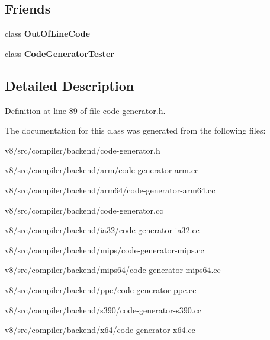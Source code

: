 \subsection*{Friends}
\begin{DoxyCompactItemize}
\item 
\mbox{\label{classv8_1_1internal_1_1compiler_1_1CodeGenerator_abbc0d1dda26f4692c37dbc47aa30debd}} 
class {\bfseries Out\+Of\+Line\+Code}
\item 
\mbox{\label{classv8_1_1internal_1_1compiler_1_1CodeGenerator_ab33a05f3bd244fd879f794b73d3d9ccb}} 
class {\bfseries Code\+Generator\+Tester}
\end{DoxyCompactItemize}


\subsection{Detailed Description}


Definition at line 89 of file code-\/generator.\+h.



The documentation for this class was generated from the following files\+:\begin{DoxyCompactItemize}
\item 
v8/src/compiler/backend/code-\/generator.\+h\item 
v8/src/compiler/backend/arm/code-\/generator-\/arm.\+cc\item 
v8/src/compiler/backend/arm64/code-\/generator-\/arm64.\+cc\item 
v8/src/compiler/backend/code-\/generator.\+cc\item 
v8/src/compiler/backend/ia32/code-\/generator-\/ia32.\+cc\item 
v8/src/compiler/backend/mips/code-\/generator-\/mips.\+cc\item 
v8/src/compiler/backend/mips64/code-\/generator-\/mips64.\+cc\item 
v8/src/compiler/backend/ppc/code-\/generator-\/ppc.\+cc\item 
v8/src/compiler/backend/s390/code-\/generator-\/s390.\+cc\item 
v8/src/compiler/backend/x64/code-\/generator-\/x64.\+cc\end{DoxyCompactItemize}
